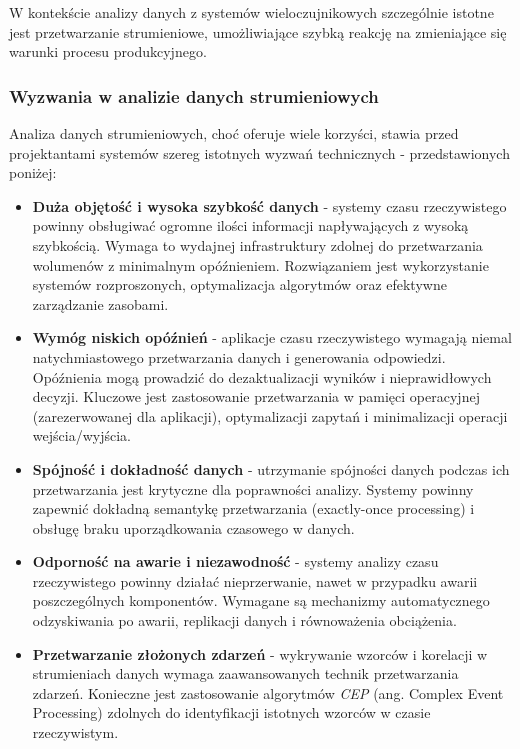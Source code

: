 W kontekście analizy danych z systemów wieloczujnikowych szczególnie istotne jest przetwarzanie strumieniowe, umożliwiające szybką reakcję na zmieniające się warunki procesu produkcyjnego.

\subsubsection{Wyzwania w analizie danych strumieniowych}
\label{subsubsec:wyzwania_analizy_rt}

Analiza danych strumieniowych, choć oferuje wiele korzyści, stawia przed projektantami systemów szereg istotnych wyzwań technicznych - przedstawionych poniżej:

\begin{itemize}
    \item \textbf{Duża objętość i wysoka szybkość danych} - systemy czasu rzeczywistego powinny obsługiwać ogromne ilości informacji napływających z wysoką szybkością. Wymaga to wydajnej infrastruktury zdolnej do przetwarzania wolumenów z minimalnym opóźnieniem. Rozwiązaniem jest wykorzystanie systemów rozproszonych, optymalizacja algorytmów oraz efektywne zarządzanie zasobami.
    
    \item \textbf{Wymóg niskich opóźnień} - aplikacje czasu rzeczywistego wymagają niemal natychmiastowego przetwarzania danych i generowania odpowiedzi. Opóźnienia mogą prowadzić do dezaktualizacji wyników i nieprawidłowych decyzji. Kluczowe jest zastosowanie przetwarzania w pamięci operacyjnej (zarezerwowanej dla aplikacji), optymalizacji zapytań i minimalizacji operacji wejścia/wyjścia.
    
    \item \textbf{Spójność i dokładność danych} - utrzymanie spójności danych podczas ich przetwarzania jest krytyczne dla poprawności analizy. Systemy powinny zapewnić dokładną semantykę przetwarzania (exactly-once processing) i obsługę braku uporządkowania czasowego w danych.
    
    \newpage

    \item \textbf{Odporność na awarie i niezawodność} - systemy analizy czasu rzeczywistego powinny działać nieprzerwanie, nawet w przypadku awarii poszczególnych komponentów. Wymagane są mechanizmy automatycznego odzyskiwania po awarii, replikacji danych i równoważenia obciążenia.
    
    \item \textbf{Przetwarzanie złożonych zdarzeń} - wykrywanie wzorców i korelacji w strumieniach danych wymaga zaawansowanych technik przetwarzania zdarzeń. Konieczne jest zastosowanie algorytmów \textit{CEP} (ang. Complex Event Processing) \cite{luckham2002power} zdolnych do identyfikacji istotnych wzorców w czasie rzeczywistym.
    

\end{itemize}
